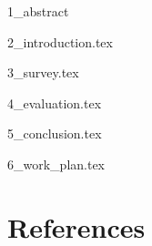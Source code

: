 \documentclass{article}
\newcommand\blankpage{%
    \null
    \thispagestyle{empty}
    \addtocounter{page}{-1}
    \newpage}
\begin{document}

    \maketitle


    \afterpage{\blankpage}

    

    \newpage

    {1_abstract}


    \tableofcontents
    \restoregeometry

    \newpage

     {
      \fancyhf{}
      \lhead[\rightmark]{\thepage}
      \rhead[\thepage]{\leftmark}
      \setlength{\parindent}{0pt}
      \setlength{\parskip}{2ex}
    }


    {2_introduction.tex}

    {3_survey.tex}

    {4_evaluation.tex}

    {5_conclusion.tex}

    {6_work_plan.tex}

    \cleardoublepage
    
    \renewcommand*{\refname}{}
    \section{References}
    


\end{document}
